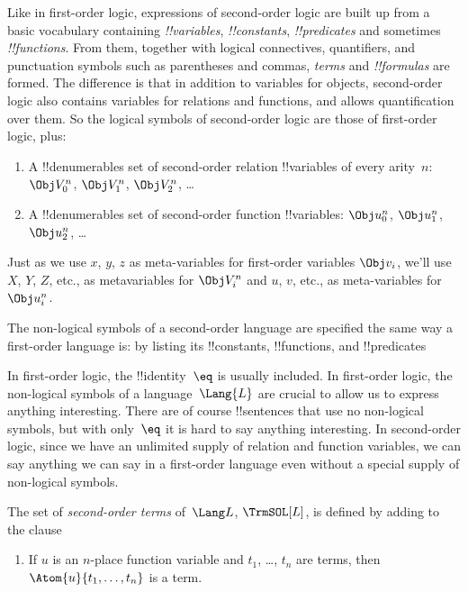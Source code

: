 \documentclass[../../../include/open-logic-section]{subfiles}
\begin{document}


Like in first-order logic, expressions of second-order logic are built
up from a basic vocabulary containing \emph{!!{variable}s},
\emph{!!{constant}s}, \emph{!!{predicate}s} and sometimes
\emph{!!{function}s}.  From them, together with logical connectives,
quantifiers, and punctuation symbols such as parentheses and commas,
\emph{terms} and \emph{!!{formula}s} are formed.  The difference is
that in addition to variables for objects, second-order logic also
contains variables for relations and functions, and allows
quantification over them. So the logical symbols of second-order logic
are those of first-order logic, plus:

\begin{enumerate}
\item A !!{denumerable}s set of second-order relation !!{variable}s of
  every arity~$n$: $\Obj V_0^n$, $\Obj V_1^n$, $\Obj V_2^n$, \dots
\item A !!{denumerable}s set of second-order function !!{variable}s:
  $\Obj u_0^n$, $\Obj u_1^n$, $\Obj u_2^n$, \dots
\end{enumerate}

Just as we use $x$, $y$, $z$ as meta-variables for first-order
variables $\Obj v_i$, we'll use $X$, $Y$, $Z$, etc., as metavariables
for $\Obj V_i^n$ and $u$, $v$, etc., as meta-variables for~$\Obj u_i^n$.

\begin{explain}
The non-logical symbols of a second-order language are specified the
same way a first-order language is: by listing its !!{constant}s,
!!{function}s, and !!{predicate}s

In first-order logic, the !!{identity}~$\eq$ is usually included. In
first-order logic, the non-logical symbols of a language~$\Lang{L}$
are crucial to allow us to express anything interesting. There are of
course !!{sentence}s that use no non-logical symbols, but with
only~$\eq$ it is hard to say anything interesting.  In second-order
logic, since we have an unlimited supply of relation and function
variables, we can say anything we can say in a first-order language
even without a special supply of non-logical symbols.
\end{explain}

\begin{defn}
The set of \emph{second-order terms} of~$\Lang L$, $\TrmSOL[L]$, is
defined by adding to  the clause
\begin{enumerate}
\item If $u$ is an $n$-place function variable and $t_1$, \dots, $t_n$
  are terms, then $\Atom{u}{t_1, \ldots, t_n}$ is a term.
\end{enumerate}
\end{defn}
\end{document}
